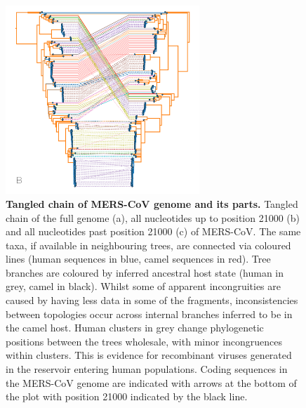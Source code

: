 \documentclass[11pt,oneside,letterpaper]{article}
\begin{document}
\begin{figure}[h]
 \centering
	\includegraphics[width=0.65\textwidth]{figures/mers_chain.png}
	\caption{\textbf{Tangled chain of MERS-CoV genome and its parts.}
	Tangled chain of the full genome (a), all nucleotides up to position 21000 (b) and all nucleotides past position 21000 (c) of MERS-CoV.
	The same taxa, if available in neighbouring trees, are connected via coloured lines (human sequences in blue, camel sequences in red).
	Tree branches are coloured by inferred ancestral host state (human in grey, camel in black).
	Whilst some of apparent incongruities are caused by having less data in some of the fragments, inconsistencies between topologies occur across internal branches inferred to be in the camel host.
	Human clusters in grey change phylogenetic positions between the trees wholesale, with minor incongruences within clusters.
	This is evidence for recombinant viruses generated in the reservoir entering human populations.
	Coding sequences in the MERS-CoV genome are indicated with arrows at the bottom of the plot with position 21000 indicated by the black line.
	}
	\label{}
\end{figure}

\end{document}
